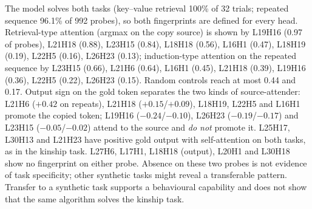 \documentclass[11pt,a4paper]{article}
\begin{document}
The model solves both tasks (key--value retrieval 100\% of 32 trials; repeated
sequence 96.1\% of 992 probes), so both fingerprints are defined for every head.
Retrieval-type attention (argmax on the copy source) is shown by L19H16 (0.97 of
probes), L21H18 (0.88), L23H15 (0.84), L18H18 (0.56), L16H1 (0.47), L18H19 (0.19),
L22H5 (0.16), L26H23 (0.13); induction-type attention on the repeated sequence by
L23H15 (0.66), L21H6 (0.64), L16H1 (0.45), L21H18 (0.39), L19H16 (0.36), L22H5
(0.22), L26H23 (0.15). Random controls reach at most 0.44 and 0.17. Output sign on the
gold token separates the two kinds of source-attender: L21H6 ($+0.42$ on repeats),
L21H18 ($+0.15$/$+0.09$), L18H19, L22H5 and L16H1 promote the copied token; L19H16
($-0.24$/$-0.10$), L26H23 ($-0.19$/$-0.17$) and L23H15 ($-0.05$/$-0.02$) attend to
the source and \emph{do not} promote it. L25H17, L30H13 and L21H23 have positive gold
output with self-attention on both tasks, as in the kinship task. L27H6, L17H1, L18H18
(output), L20H1 and L30H18 show no fingerprint on either probe. Absence on these two
probes is not evidence of task specificity; other synthetic tasks might reveal a
transferable pattern. Transfer to a synthetic task supports a behavioural
capability and does not show that the same algorithm solves the kinship task.
\end{document}
